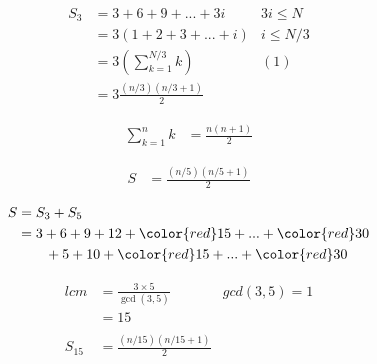 \begin{align*}
  S_3  &= 3 + 6 + 9 + ... + 3i  & 3i  \leq  N \\
      &= 3 (1 + 2 + 3 + ... + i) & i  \leq  N/3 \\
      &= 3 ( \sum_{k=1}^{N/3} k ) & (1)\\
      &= 3  \frac{(n/3)(n/3 + 1) }{2} 
\end{align*}

\begin{align*}
  \sum_{k=1}^{n} k  &= \frac{n(n + 1) }{2}
\end{align*}

\begin{align*}
  S &= \frac{(n/5)(n/5 + 1) }{2}
\end{align*}

 \begin{align*}
  S &= S_3 + S_5 \\
    &= 3 + 6 + 9 + 12 + {\color{red}15} + ... + {\color{red}30} \nonumber \\
      &\qquad {} + 5 + 10 + {\color{red}15} + ... + {\color{red}30}
\end{align*}

\begin{align*}
  lcm &= \frac{3 \times 5}{ \gcd(3,5) } & gcd(3,5) = 1 \\
  &= 15 \\
  { } \\
  S_{15} &= \frac{(n/15)(n/15 + 1)}{2}
\end{align*}


